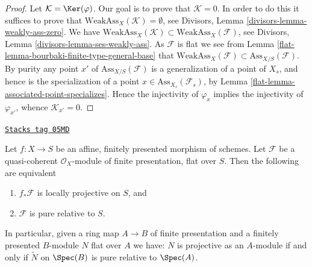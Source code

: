 \begin{proof}

Let $\mathcal{K} = \Ker(\varphi)$. Our goal is to prove that
$\mathcal{K} = 0$. In order to do this it suffices to prove that
$\text{WeakAss}_X(\mathcal{K}) = \emptyset$, see
Divisors, Lemma \ref{divisors-lemma-weakly-ass-zero}.
We have
$\text{WeakAss}_X(\mathcal{K}) \subset \text{WeakAss}_X(\mathcal{F})$, see
Divisors, Lemma \ref{divisors-lemma-ses-weakly-ass}.
As $\mathcal{F}$ is flat we see from
Lemma \ref{flat-lemma-bourbaki-finite-type-general-base}
that $\text{WeakAss}_X(\mathcal{F}) \subset \text{Ass}_{X/S}(\mathcal{F})$.
By purity any point $x'$ of $\text{Ass}_{X/S}(\mathcal{F})$
is a generalization of a point of $X_s$, and hence is the
specialization of a point $x \in \text{Ass}_{X_s}(\mathcal{F}_s)$, by
Lemma \ref{flat-lemma-associated-point-specializes}.
Hence the injectivity of $\varphi_x$ implies the injectivity of
$\varphi_{x'}$, whence $\mathcal{K}_{x'} = 0$.
\end{proof}

\begin{proposition}
\label{flat-proposition-finite-presentation-flat-pure-is-projective}
\href{https://stacks.math.columbia.edu/tag/05MD}{\texttt{Stacks tag 05MD}}

Let $f : X \to S$ be an affine, finitely presented morphism of schemes.
Let $\mathcal{F}$ be a quasi-coherent $\mathcal{O}_X$-module of
finite presentation, flat over $S$. Then the following
are equivalent
\begin{enumerate}
\item $f_*\mathcal{F}$ is locally projective on $S$, and
\item $\mathcal{F}$ is pure relative to $S$.
\end{enumerate}
In particular, given a ring map $A \to B$ of finite presentation and
a finitely presented $B$-module $N$ flat over $A$ we have:
$N$ is projective as an $A$-module if and only if $\widetilde{N}$
on $\Spec(B)$ is pure relative to $\Spec(A)$.
\end{proposition}

